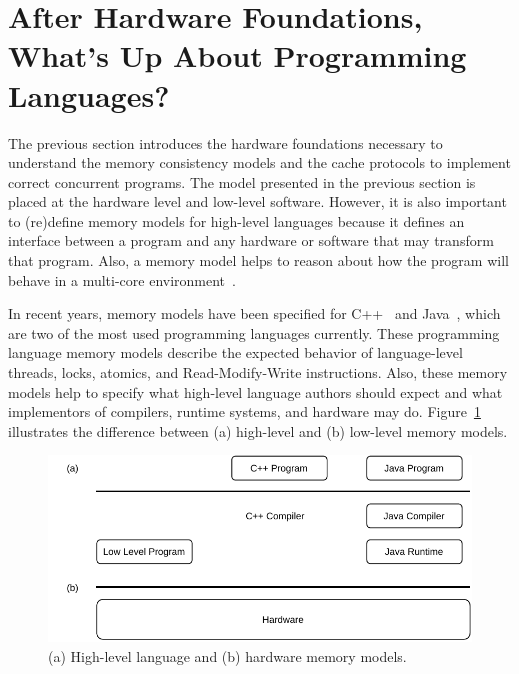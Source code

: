 \section{After Hardware Foundations, What's Up About Programming Languages?}

The previous section introduces the hardware foundations necessary to understand the memory consistency models and the cache protocols to implement correct concurrent programs. The model presented in the previous section is placed at the hardware level and low-level software. However, it is also important to (re)define memory models for high-level languages because it defines an interface between a program and any hardware or software that may transform that program. Also, a memory model helps to reason about how the program will behave in a multi-core environment~\cite{DBLP_journals_cacm_AdveB10, DBLP_series_synthesis_2020Nagarajan}.

In recent years, memory models have been specified for C++~\cite{DBLP_conf_pldi_BoehmA08} and Java~\cite{DBLP_conf_popl_MansonPA05}, which are two of the most used programming languages currently. These programming language memory models describe the expected behavior of language-level threads, locks, atomics, and Read-Modify-Write instructions. Also, these memory models help to specify what high-level language authors should expect and what implementors of compilers, runtime systems, and hardware may do. Figure~\ref{fig:memory-models} illustrates the difference between (a) high-level and (b) low-level memory models.

\begin{figure}[ht!]
    \centering
    \includegraphics[width=0.9\linewidth]{contents//figures/III_3_memory_model.pdf}
    \caption{(a) High-level language and (b) hardware memory models.}
    \label{fig:memory-models}
\end{figure}

